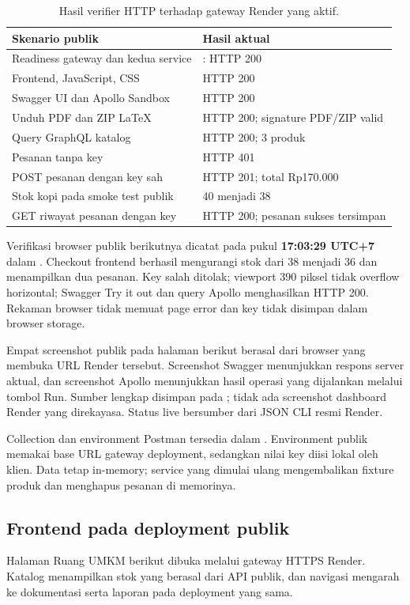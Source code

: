\begin{table}[H]
\small
\begin{tabularx}{\linewidth}{@{}Y L{5.6cm}@{}}
\toprule
Skenario publik & Hasil aktual \\
\midrule
Readiness gateway dan kedua service & : HTTP 200 \\
Frontend, JavaScript, CSS & HTTP 200 \\
Swagger UI dan Apollo Sandbox & HTTP 200 \\
Unduh PDF dan ZIP LaTeX & HTTP 200; signature PDF/ZIP valid \\
Query GraphQL katalog & HTTP 200; 3 produk \\
Pesanan tanpa key & HTTP 401 \\
POST pesanan dengan key sah & HTTP 201; total Rp170.000 \\
Stok kopi pada smoke test publik & 40 menjadi 38 \\
GET riwayat pesanan dengan key & HTTP 200; pesanan sukses tersimpan \\
\bottomrule
\end{tabularx}
\caption{Hasil verifier HTTP terhadap gateway Render yang aktif.}
\end{table}

Verifikasi browser publik berikutnya dicatat pada pukul
\textbf{17:03:29 UTC+7} dalam
. Checkout frontend
berhasil mengurangi stok dari 38 menjadi 36 dan menampilkan dua pesanan.
Key salah ditolak; viewport 390 piksel tidak overflow horizontal;
Swagger Try it out dan query Apollo menghasilkan HTTP 200. Rekaman
browser tidak memuat page error dan key tidak disimpan dalam browser storage.

Empat screenshot publik pada halaman berikut berasal dari browser yang
membuka URL Render tersebut. Screenshot Swagger menunjukkan respons
server aktual, dan screenshot Apollo menunjukkan hasil operasi yang
dijalankan melalui tombol Run. Sumber lengkap disimpan pada
; tidak ada screenshot dashboard Render
yang direkayasa. Status live bersumber dari JSON CLI resmi Render.

Collection dan environment Postman tersedia dalam .
Environment publik memakai base URL gateway deployment, sedangkan nilai
key diisi lokal oleh klien. Data tetap in-memory; service yang dimulai
ulang mengembalikan fixture produk dan menghapus pesanan di memorinya.

\clearpage
\subsection{Frontend pada deployment publik}
Halaman Ruang UMKM berikut dibuka melalui gateway HTTPS Render.
Katalog menampilkan stok yang berasal dari API publik, dan navigasi
mengarah ke dokumentasi serta laporan pada deployment yang sama.

